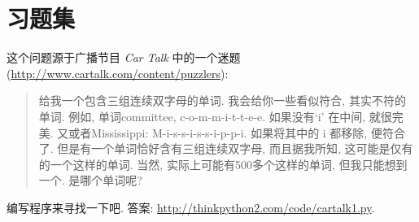 \documentclass[10pt]{book}
\begin{document}
\section{习题集}

\begin{exercise}


这个问题源于广播节目 {\em Car Talk} 中的一个迷题
(\url{http://www.cartalk.com/content/puzzlers}):

\begin{quote}
给我一个包含三组连续双字母的单词. 
我会给你一些看似符合, 其实不符的单词. 
例如, 单词committee,  c-o-m-m-i-t-t-e-e. 
如果没有`i' 在中间, 就很完美. 
又或者Mississippi: M-i-s-s-i-s-s-i-p-p-i.
如果将其中的 i 都移除, 便符合了. 
但是有一个单词恰好含有三组连续双字母, 而且据我所知, 
这可能是仅有的一个这样的单词. 
当然, 实际上可能有500多个这样的单词, 但我只能想到一个. 
是哪个单词呢?
\end{quote}

编写程序来寻找一下吧. 
答案: \url{http://thinkpython2.com/code/cartalk1.py}.

\end{exercise}
\end{document}
